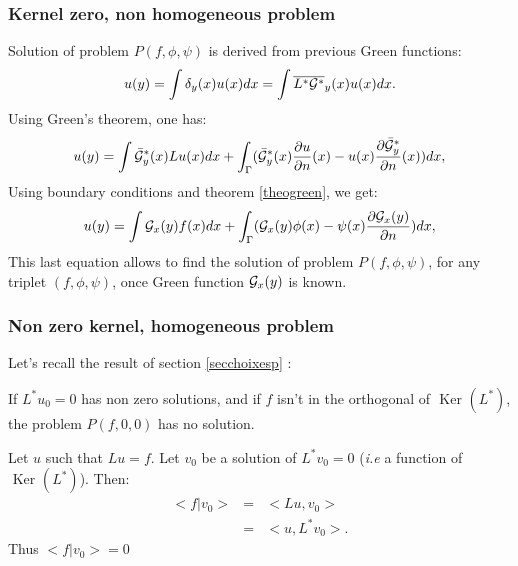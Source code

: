 \documentclass[12pt]{book}
\begin{document}
\subsubsection{Kernel zero, non homogeneous problem}
Solution of problem $P(f,\phi,\psi)$ is derived from previous Green functions:
\begin{equation}
u(y)=\int \delta_y(x)u(x)dx=\int \overline{L^*{\cal G^*}}_y(x)u(x)dx.
\end{equation}
Using Green's theorem, one has:
\begin{equation}
u(y)=\int \bar{\cal G}^*_y(x) Lu(x)dx
+\int_\Gamma  (\bar{\cal G}^*_y(x)\frac{\partial u}{\partial
n}(x)-u(x)\frac{\partial \bar{\cal G}^*_y}{\partial n}(x))dx,
\end{equation}
Using boundary conditions and theorem \ref{theogreen}, we get:
\begin{equation}
u(y)=\int {\cal G}_x(y) f(x)dx+\int_\Gamma  ({\cal
G}_x(y)\phi(x)-\psi(x)\frac{\partial {\cal G}_x(y)}{\partial n})dx, 
\end{equation}
This last equation allows to find the solution of problem
$P(f,\phi,\psi)$, for any triplet $(f,\phi,\psi)$, once Green function
${\cal G}_x(y)$ is known.


\subsubsection{Non zero kernel, homogeneous problem}
Let's recall the result of section \ref{secchoixesp} :
\begin{thm}
If  $L^*u_0=0$ has non zero solutions, and if $f$ isn't in the orthogonal of
$\mbox{ Ker }(L^*)$, the problem $P(f,0,0)$ has no solution.
\end{thm}
\begin{pf}
Let $u$ such that $Lu=f$. Let $v_0$ be a solution of
$L^*v_0=0$ ({\it i.e} a function of 
$\mbox{ Ker }(L^*)$).
Then:
\begin{eqnarray}
 \mathrel{<} f|v_0\mathrel{>} &=& \mathrel{<} Lu,v_0\mathrel{>}  \nonumber\\
       &=& \mathrel{<} u,L^*v_0\mathrel{>}.
\end{eqnarray} 
Thus $ \mathrel{<} f|v_0\mathrel{>} =0$
\end{pf}
\end{document}
